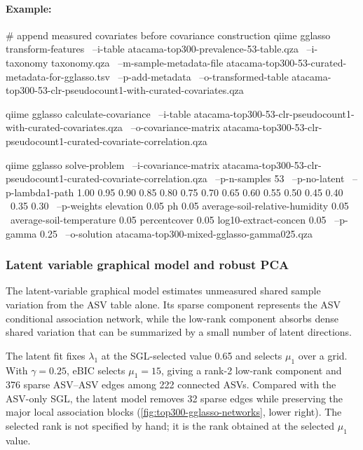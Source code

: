 \documentclass[11pt,a4paper]{article}
\begin{document}
\paragraph{Example:} \mbox{}
\begin{PseudoCode}
# append measured covariates before covariance construction
qiime gglasso transform-features \
    --i-table atacama-top300-prevalence-53-table.qza \
    --i-taxonomy taxonomy.qza \
    --m-sample-metadata-file atacama-top300-53-curated-metadata-for-gglasso.tsv \
    --p-add-metadata \
    --o-transformed-table atacama-top300-53-clr-pseudocount1-with-curated-covariates.qza

qiime gglasso calculate-covariance \
    --i-table atacama-top300-53-clr-pseudocount1-with-curated-covariates.qza \
    --o-covariance-matrix atacama-top300-53-clr-pseudocount1-curated-covariate-correlation.qza

qiime gglasso solve-problem \
    --i-covariance-matrix atacama-top300-53-clr-pseudocount1-curated-covariate-correlation.qza \
    --p-n-samples 53 \
    --p-no-latent \
    --p-lambda1-path 1.00 0.95 0.90 0.85 0.80 0.75 0.70 0.65 0.60 0.55 0.50 0.45 0.40 \
        0.35 0.30 \
    --p-weights elevation 0.05 ph 0.05 average-soil-relative-humidity 0.05 \
        average-soil-temperature 0.05 percentcover 0.05 log10-extract-concen 0.05 \
    --p-gamma 0.25 \
    --o-solution atacama-top300-mixed-gglasso-gamma025.qza
\end{PseudoCode}

\subsubsection{Latent variable graphical model and robust PCA}
\label{sec:highdim-slr}

The latent-variable graphical model estimates unmeasured shared sample variation
from the ASV table alone. Its sparse component
represents the ASV conditional association network, while the low-rank component
absorbs dense shared variation that can be summarized by a small number of
latent directions.

The latent fit fixes $\lambda_1$ at the SGL-selected value 0.65 and selects
$\mu_1$ over a grid. With $\gamma=0.25$, eBIC selects
$\mu_1=15$, giving a rank-2 low-rank component and 376 sparse ASV--ASV edges
among 222 connected ASVs. Compared with the ASV-only SGL, the latent model
removes 32 sparse edges while preserving the major local association blocks
(\autoref{fig:top300-gglasso-networks}, lower right). The selected rank is not
specified by hand; it is the rank obtained at the selected $\mu_1$ value.
\end{document}
